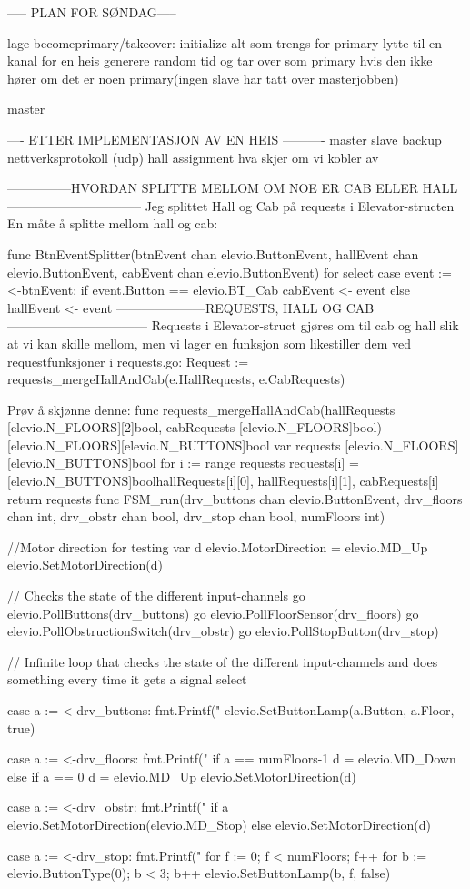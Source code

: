 ----- PLAN FOR SØNDAG-----

lage becomeprimary/takeover:
	initialize
	alt som trengs for primary
	lytte til en kanal for en heis 
	generere random tid og tar over som primary hvis den ikke hører om det er noen primary(ingen slave har tatt over masterjobben)

master


---- ETTER IMPLEMENTASJON AV EN HEIS ----------
master slave
backup
nettverksprotokoll (udp)
hall assignment
hva skjer om vi kobler av


---------------HVORDAN SPLITTE MELLOM OM NOE ER CAB ELLER HALL--------------------------------
Jeg splittet Hall og Cab på requests i Elevator-structen
En måte å splitte mellom hall og cab:

func BtnEventSplitter(btnEvent chan elevio.ButtonEvent,
	hallEvent chan elevio.ButtonEvent,
	cabEvent chan elevio.ButtonEvent) {
	for {
		select {
		case event := <-btnEvent:
			if event.Button == elevio.BT_Cab {
				cabEvent <- event
			} else {
				hallEvent <- event
			}
		}
	}
}
---------------------REQUESTS, HALL OG CAB---------------------------------
Requests i Elevator-struct gjøres om til cab og hall slik at vi kan skille mellom, men vi lager en funksjon 
som likestiller dem ved requestfunksjoner i requests.go:
Request := requests_mergeHallAndCab(e.HallRequests, e.CabRequests)

Prøv å skjønne denne: 
func requests_mergeHallAndCab(hallRequests [elevio.N_FLOORS][2]bool, cabRequests [elevio.N_FLOORS]bool) [elevio.N_FLOORS][elevio.N_BUTTONS]bool {
	var requests [elevio.N_FLOORS][elevio.N_BUTTONS]bool
	for i := range requests {
		requests[i] = [elevio.N_BUTTONS]bool{hallRequests[i][0], hallRequests[i][1], cabRequests[i]}
	}
	return requests
}
func FSM_run(drv_buttons chan elevio.ButtonEvent, drv_floors chan int, drv_obstr chan bool, drv_stop chan bool, numFloors int) {

	//Motor direction for testing
	var d elevio.MotorDirection = elevio.MD_Up
	elevio.SetMotorDirection(d)


	// Checks the state of the different input-channels
	go elevio.PollButtons(drv_buttons)
	go elevio.PollFloorSensor(drv_floors)
	go elevio.PollObstructionSwitch(drv_obstr)
	go elevio.PollStopButton(drv_stop)

	// Infinite loop that checks the state of the different input-channels and does something every time it gets a signal
	select {
	case a := <-drv_buttons:
		fmt.Printf("%
		elevio.SetButtonLamp(a.Button, a.Floor, true)

	case a := <-drv_floors:
		fmt.Printf("%
		if a == numFloors-1 {
			d = elevio.MD_Down
		} else if a == 0 {
			d = elevio.MD_Up
		}
		elevio.SetMotorDirection(d)

	case a := <-drv_obstr:
		fmt.Printf("%
		if a {
			elevio.SetMotorDirection(elevio.MD_Stop)
		} else {
			elevio.SetMotorDirection(d)
		}

	case a := <-drv_stop:
		fmt.Printf("%
		for f := 0; f < numFloors; f++ {
			for b := elevio.ButtonType(0); b < 3; b++ {
				elevio.SetButtonLamp(b, f, false)
			}
		}
	}

}

